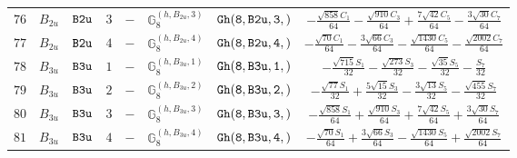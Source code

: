 \documentclass[fleqn,8pt]{jsarticle}
\begin{document}
\begin{table}[ht!]
\begin{center}
\begin{tabular}{cccccccc}
$ 76 $ & $ B_{2u} $ & $ {\tt B2u} $ & $ 3 $ & $ - $ & $ \mathbb{G}_{8}^{(h,B_{2u},3)} $ & $ {\tt Gh(8,B2u,3,)} $ & $ - \frac{\sqrt{858} C_{1}}{64} - \frac{\sqrt{910} C_{3}}{64} + \frac{7 \sqrt{42} C_{5}}{64} - \frac{3 \sqrt{30} C_{7}}{64} $ \\
$ 77 $ & $ B_{2u} $ & $ {\tt B2u} $ & $ 4 $ & $ - $ & $ \mathbb{G}_{8}^{(h,B_{2u},4)} $ & $ {\tt Gh(8,B2u,4,)} $ & $ - \frac{\sqrt{70} C_{1}}{64} - \frac{3 \sqrt{66} C_{3}}{64} - \frac{\sqrt{1430} C_{5}}{64} - \frac{\sqrt{2002} C_{7}}{64} $ \\
$ 78 $ & $ B_{3u} $ & $ {\tt B3u} $ & $ 1 $ & $ - $ & $ \mathbb{G}_{8}^{(h,B_{3u},1)} $ & $ {\tt Gh(8,B3u,1,)} $ & $ - \frac{\sqrt{715} S_{1}}{32} - \frac{\sqrt{273} S_{3}}{32} - \frac{\sqrt{35} S_{5}}{32} - \frac{S_{7}}{32} $ \\
$ 79 $ & $ B_{3u} $ & $ {\tt B3u} $ & $ 2 $ & $ - $ & $ \mathbb{G}_{8}^{(h,B_{3u},2)} $ & $ {\tt Gh(8,B3u,2,)} $ & $ - \frac{\sqrt{77} S_{1}}{32} + \frac{5 \sqrt{15} S_{3}}{32} - \frac{3 \sqrt{13} S_{5}}{32} - \frac{\sqrt{455} S_{7}}{32} $ \\
$ 80 $ & $ B_{3u} $ & $ {\tt B3u} $ & $ 3 $ & $ - $ & $ \mathbb{G}_{8}^{(h,B_{3u},3)} $ & $ {\tt Gh(8,B3u,3,)} $ & $ - \frac{\sqrt{858} S_{1}}{64} + \frac{\sqrt{910} S_{3}}{64} + \frac{7 \sqrt{42} S_{5}}{64} + \frac{3 \sqrt{30} S_{7}}{64} $ \\
$ 81 $ & $ B_{3u} $ & $ {\tt B3u} $ & $ 4 $ & $ - $ & $ \mathbb{G}_{8}^{(h,B_{3u},4)} $ & $ {\tt Gh(8,B3u,4,)} $ & $ - \frac{\sqrt{70} S_{1}}{64} + \frac{3 \sqrt{66} S_{3}}{64} - \frac{\sqrt{1430} S_{5}}{64} + \frac{\sqrt{2002} S_{7}}{64} $ \\
 \hline \hline
\end{tabular}
\end{center}
\end{table}
\end{document}

